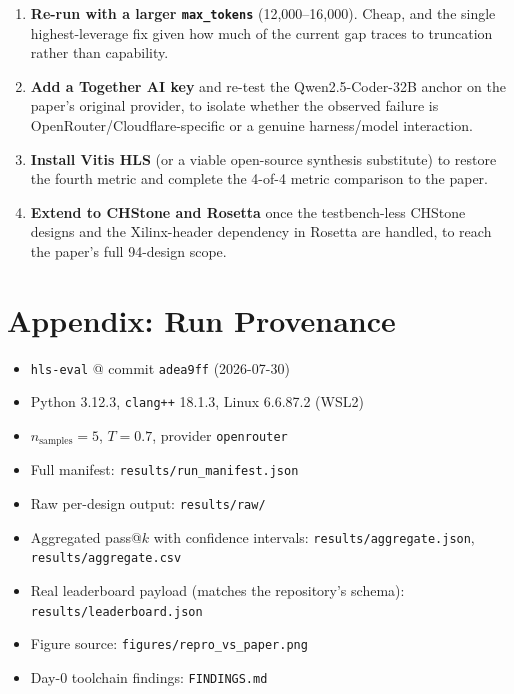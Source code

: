 \documentclass[11pt]{article}
\newcommand{\code}[1]{\texttt{#1}}
\begin{document}
\begin{enumerate}[leftmargin=*]
\item \textbf{Re-run with a larger \code{max\_tokens}} (12{,}000--16{,}000).
Cheap, and the single highest-leverage fix given how much of the
current gap traces to truncation rather than capability.
\item \textbf{Add a Together AI key} and re-test the Qwen2.5-Coder-32B
anchor on the paper's original provider, to isolate whether the
observed failure is OpenRouter/Cloudflare-specific or a genuine
harness/model interaction.
\item \textbf{Install Vitis HLS} (or a viable open-source synthesis
substitute) to restore the fourth metric and complete the 4-of-4 metric
comparison to the paper.
\item \textbf{Extend to CHStone and Rosetta} once the testbench-less
CHStone designs and the Xilinx-header dependency in Rosetta are
handled, to reach the paper's full 94-design scope.
\end{enumerate}

\section*{Appendix: Run Provenance}

\begin{itemize}[leftmargin=*]
\item \code{hls-eval} @ commit \code{adea9ff} (2026-07-30)
\item Python 3.12.3, \code{clang++} 18.1.3, Linux 6.6.87.2 (WSL2)
\item $n_{\text{samples}}=5$, $T=0.7$, provider \code{openrouter}
\item Full manifest: \code{results/run\_manifest.json}
\item Raw per-design output: \code{results/raw/}
\item Aggregated pass@$k$ with confidence intervals:
\code{results/aggregate.json}, \code{results/aggregate.csv}
\item Real leaderboard payload (matches the repository's schema):
\code{results/leaderboard.json}
\item Figure source: \code{figures/repro\_vs\_paper.png}
\item Day-0 toolchain findings: \code{FINDINGS.md}
\end{itemize}
\end{document}
